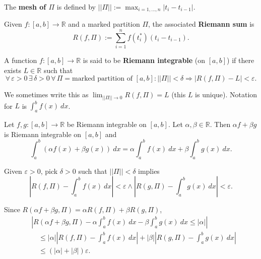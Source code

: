 \documentclass{notes}
\begin{document}
  \begin{defn}
    The {\boldmath \bfseries mesh of $\Pi$} is defined by $|| \Pi || := \max_{i = 1, \dots, n} \left | t_i - t_{i - 1} \right |$.
  \end{defn}
  
  \begin{defn}
    Given $f \colon [a, b] \to \mathbb R$ and a marked partition $\Pi$, the associated {\boldmath \bfseries Riemann sum} is 
    \[
      R(f, \Pi) := \sum_{i = 1}^n f(t^*_i) (t_i - t_{i - 1}).
    \]
  \end{defn}
  
  \newpage
  
  \begin{defn}
    A function $f \colon [a, b] \to \mathbb R$ is said to be {\boldmath \bfseries Riemann integrable} (on $[a, b]$) if there exists $L \in \mathbb R$ such that 
    \[
      \forall \, \varepsilon > 0 \, \exists \, \delta > 0 \, \forall \, \Pi = \text{marked partition of $[a, b]$}: || \Pi || < \delta \Rightarrow \left | R(f, \Pi) - L \right | < \varepsilon.
    \]
    
    We sometimes write this as $\lim_{|| \Pi || \to 0} R(f, \Pi) = L$ (this $L$ is unique).
    Notation for $L$ is $\int_a^b f(x)\ dx$.
  \end{defn}
  
  \begin{lem}
    Let $f, g \colon [a, b] \to \mathbb R$ be Riemann integrable on $[a, b]$.
    Let $\alpha, \beta \in \mathbb R$.
    Then $\alpha f + \beta g$ is Riemann integrable on $[a, b]$ and 
    \[
      \int_a^b (\alpha f(x) + \beta g(x))\ dx = \alpha \int_a^b f(x)\ dx + \beta \int_a^b g(x)\ dx.
    \]
  \end{lem}
  
  \begin{prf}
    Given $\varepsilon > 0$, pick $\delta > 0$ such that $|| \Pi || < \delta$ implies 
    \[
      \left | R(f, \Pi) - \int_a^b f(x)\ dx \right | < \varepsilon \land \left | R(g, \Pi) - \int_a^b g(x)\ dx \right | < \varepsilon.
    \]
    
    Since $R(\alpha f + \beta g, \Pi) = \alpha R(f, \Pi) + \beta R(g, \Pi)$, 
    \begin{align*}
      &\left | R(\alpha f + \beta g, \Pi) - \alpha \int_a^b f(x)\ dx - \beta \int_a^b g(x)\ dx \leq \left | \alpha \right | \right | \\ 
      &\quad \leq \left | \alpha \right | \left | R(f, \Pi) - \int_a^b f(x)\ dx \right | + \left | \beta \right | \left | R(g, \Pi) - \int_a^b g(x)\ dx \right | \\ 
      &\quad \leq (\left | \alpha \right | + \left | \beta \right |) \varepsilon.
    \end{align*}
  \end{prf}
  
\end{document}
